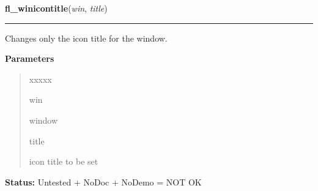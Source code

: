 \hspace{.8\funcindent}\begin{boxedminipage}{\funcwidth}

    \raggedright \textbf{fl\_winicontitle}(\textit{win}, \textit{title})

    \vspace{-1.5ex}

    \rule{\textwidth}{0.5\fboxrule}
\setlength{\parskip}{2ex}
    Changes only the icon title for the window.

\setlength{\parskip}{1ex}
      \textbf{Parameters}
      \vspace{-1ex}

      \begin{quote}
        \begin{Ventry}{xxxxx}

          \item[win]

          window

          \item[title]

          icon title to be set

        \end{Ventry}

      \end{quote}

\textbf{Status:} Untested + NoDoc + NoDemo = NOT OK



    \end{boxedminipage}

    \label{xformslib:library:fl_winposition}

    \vspace{0.5ex}

